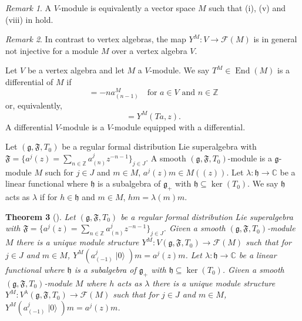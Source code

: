\documentclass[a4paper, 12pt, reqno]{amsart}
\newtheorem{theorem}{Theorem}[subsection]
\theoremstyle{remark}
\newtheorem{remark}[theorem]{Remark}
\numberwithin{equation}{subsection}
\DeclareMathOperator{\End}{End}
\DeclareMathOperator{\vac}{|0\rangle}
\begin{document}
\begin{remark}
  \label{rmk:18}
  A $V$-module is equivalently a vector space $M$ such that (i), (v) and (viii) in  hold.
\end{remark}

\begin{remark}
  \label{rmk:19}
  In contrast to vertex algebras, the map $Y^M: V \to \mathcal{F}(M)$ is in general not injective for a module $M$ over a vertex algebra $V$.
\end{remark}

Let $V$ be a vertex algebra and let $M$ a $V$-module.
We say  $T^M \in \End(M)$ is a differential of $M$ if
\begin{equation*}
  [T^M, a^M_{(n)}] = -na^M_{(n - 1)} \quad \text{for } a \in V\text{ and }n \in \mathbb{Z}
\end{equation*}
or, equivalently,
\begin{equation*}
  [T^M, Y^M(a, z)] = Y^M(Ta, z).
\end{equation*}
A differential $V$-module is a $V$-module equipped with a differential.

Let $(\mathfrak{g}, \mathfrak{F}, T_0)$ be a regular formal distribution Lie superalgebra with $\mathfrak{F} = \{a^j(z) = \sum_{n \in \mathbb{Z}}a^j_{(n)}z^{-n - 1}\}_{j \in J}$.
A smooth $(\mathfrak{g}, \mathfrak{F}, T_0)$-module is a $\mathfrak{g}$-module $M$ such for $j \in J$ and $m \in M$, $a^j(z)m \in M((z))$.
Let $\lambda: \mathfrak{h} \to \mathbb{C}$ be a linear functional where $\mathfrak{h}$ is a subalgebra of $\mathfrak{g}_+$ with $\mathfrak{h} \subseteq \ker(T_0)$.
We say $\mathfrak{h}$ acts as $\lambda$ if for $h \in \mathfrak{h}$ and $m \in M$, $hm = \lambda(m)m$.


\begin{theorem}[{\cite[Theorem 2.15]{li_vertex_2004}}]
  \label{thr:21}
  Let $(\mathfrak{g}, \mathfrak{F}, T_0)$ be a regular formal distribution Lie superalgebra with $\mathfrak{F} = \{a^j(z) = \sum_{n \in \mathbb{Z}}a^j_{(n)}z^{-n - 1}\}_{j \in J}$.
  Given a smooth $(\mathfrak{g}, \mathfrak{F}, T_0)$-module $M$ there is a unique module structure $Y^M: V(\mathfrak{g}, \mathfrak{F}, T_0) \to \mathcal{F}(M)$ such that for $j \in J$ and $m \in M$, $Y^M(a^j_{(-1)}\vac)m = a^j(z)m$.
  Let $\lambda: \mathfrak{h} \to \mathbb{C}$ be a linear functional where $\mathfrak{h}$ is a subalgebra of $\mathfrak{g}_+$ with $\mathfrak{h} \subseteq \ker(T_0)$.
  Given a smooth $(\mathfrak{g}, \mathfrak{F}, T_0)$-module $M$ where $h$ acts as $\lambda$ there is a unique module structure $Y^M: V^{\lambda}(\mathfrak{g}, \mathfrak{F}, T_0) \to \mathcal{F}(M)$ such that for $j \in J$ and $m \in M$, $Y^M(a^j_{(-1)}\vac)m = a^j(z)m$.
\end{theorem}
\end{document}

